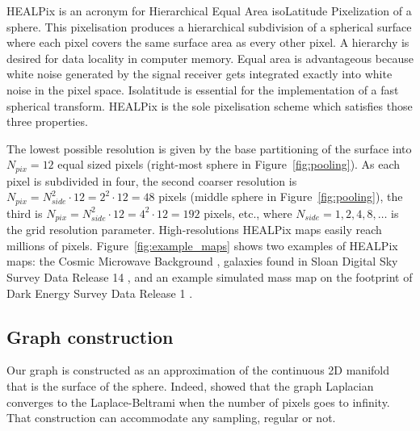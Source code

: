 \documentclass[final,twocolumn,3p,times,authoryear]{elsarticle}
\newcommand{\figref}[1]{Figure~\ref{fig:#1}}
\newcommand{\1}{\b{1}}              %
\newcommand{\0}{\b{0}}              %
\begin{document}
HEALPix is an acronym for Hierarchical Equal Area isoLatitude Pixelization of a sphere.
This pixelisation produces a hierarchical subdivision of a spherical surface where each pixel covers the same surface area as every other pixel.
A hierarchy is desired for data locality in computer memory.
Equal area is advantageous because white noise generated by the signal receiver gets integrated exactly into white noise in the pixel space.
Isolatitude is essential for the implementation of a fast spherical transform.
HEALPix is the sole pixelisation scheme which satisfies those three properties.

The lowest possible resolution is given by the base partitioning of the surface into $N_{pix} = 12$ equal sized pixels (right-most sphere in \figref{pooling}).
As each pixel is subdivided in four, the second coarser resolution is $N_{pix} = N_{side}^2 \cdot 12 = 2^2 \cdot 12 = 48$ pixels (middle sphere in \figref{pooling}), the third is $N_{pix} = N_{side}^2 \cdot 12 = 4^2 \cdot 12 = 192$ pixels, etc., where $N_{side} = 1, 2, 4, 8, \ldots$ is the grid resolution parameter.
High-resolutions HEALPix maps easily reach millions of pixels.
\figref{example_maps} shows two examples of HEALPix maps: the Cosmic Microwave Background \citep{planck2015overview}, galaxies found in Sloan Digital Sky Survey Data Release 14 \citep{abolfathi2017sdssDR14}, and an example simulated mass map on the footprint of Dark Energy Survey Data Release 1 \citep{des2018dr1}.

\subsection{Graph construction}

Our graph is constructed as an approximation of the continuous 2D manifold that is the surface of the sphere.
Indeed, \citet{belkin2007convergence} showed that the graph Laplacian converges to the Laplace-Beltrami when the number of pixels goes to infinity.
That construction can accommodate any sampling, regular or not.
\end{document}
